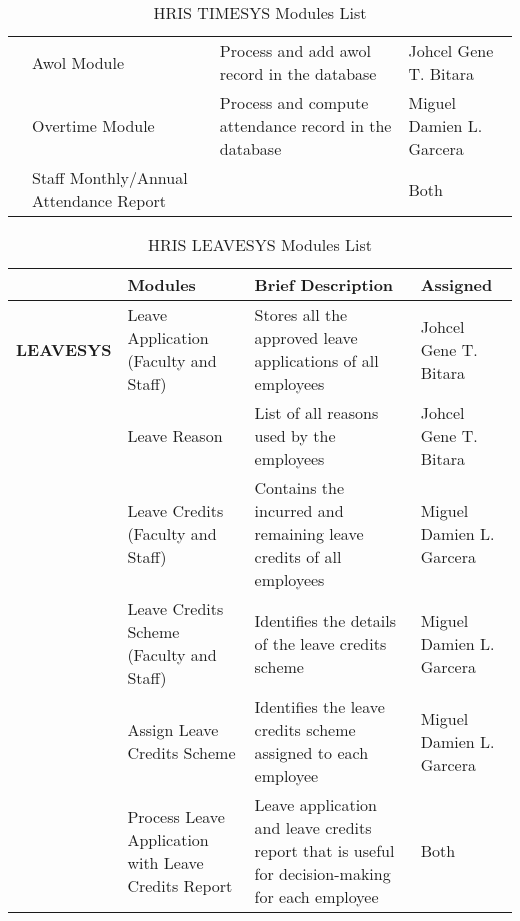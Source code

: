 \begin{table}[H]
\begin{tabular}{@{}p{2cm}p{3.5cm}p{6cm}p{3.5cm}@{}}
                        & Awol Module                            & Process and add awol record in the database                                                   & Johcel Gene T. Bitara               \\
                        & Overtime Module                        & Process and compute attendance record in the database                                         & Miguel Damien L. Garcera               \\
                        & Staff Monthly/Annual Attendance Report &                                                                                               & Both               \\ \bottomrule
    \end{tabular}
    \caption{HRIS TIMESYS Modules List}
    \label{tab:hris-timesys-modules}
\end{table}
    
\begin{table}[H]
    \begin{tabular}{@{}p{2cm}p{3.5cm}p{6cm}p{3.5cm}@{}}
    \toprule
    \multicolumn{1}{l}{} & \textbf{Modules}                                    & \textbf{Brief Description}                                                                       & \textbf{Assigned}  \\ \midrule
    \textbf{LEAVESYS}    & Leave Application (Faculty and Staff)               & Stores all the approved leave applications of all employees                                      & Johcel Gene T. Bitara               \\
                            & Leave Reason                                        & List of all reasons used by the employees                                                        & Johcel Gene T. Bitara               \\
                            & Leave Credits (Faculty and Staff)                   & Contains the incurred and remaining leave credits of all employees                               & Miguel Damien L. Garcera               \\
                            & Leave Credits Scheme (Faculty and Staff)            & Identifies the details of the leave credits scheme                                               & Miguel Damien L. Garcera               \\
                            & Assign Leave Credits Scheme                         & Identifies the leave credits scheme assigned to each employee                                    & Miguel Damien L. Garcera               \\
                            & Process Leave Application with Leave Credits Report & Leave application and leave credits report that is useful for decision-making for each employee  & Both               \\ \bottomrule
    \end{tabular}
    \caption{HRIS LEAVESYS Modules List}
    \label{tab:hris-leavesys-modules}
\end{table}

